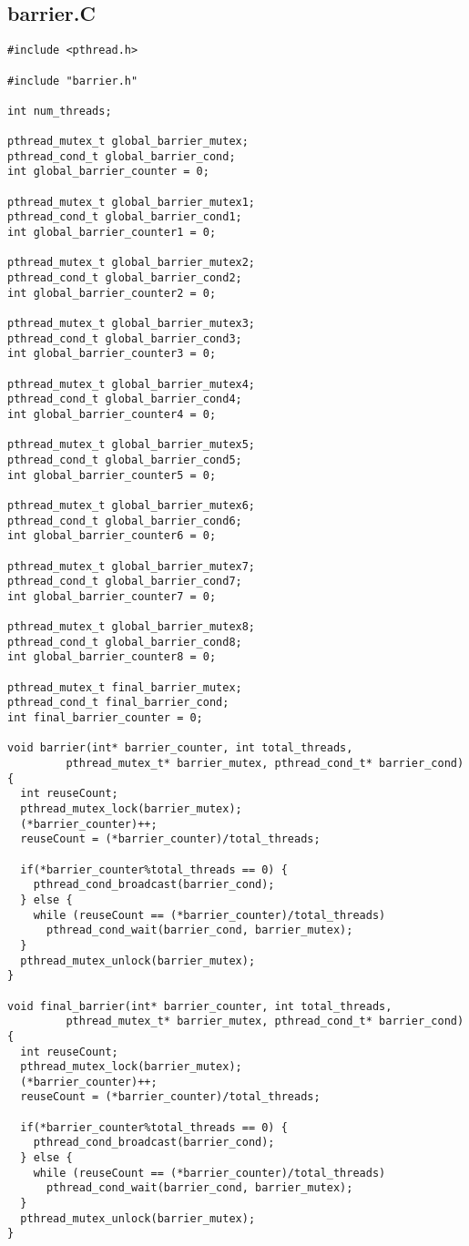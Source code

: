 \documentclass[]{article}
\begin{document}
\subsection{barrier.C}
\begin{verbatim}
#include <pthread.h>

#include "barrier.h"

int num_threads;

pthread_mutex_t global_barrier_mutex;
pthread_cond_t global_barrier_cond;
int global_barrier_counter = 0;

pthread_mutex_t global_barrier_mutex1;
pthread_cond_t global_barrier_cond1;
int global_barrier_counter1 = 0;

pthread_mutex_t global_barrier_mutex2;
pthread_cond_t global_barrier_cond2;
int global_barrier_counter2 = 0;

pthread_mutex_t global_barrier_mutex3;
pthread_cond_t global_barrier_cond3;
int global_barrier_counter3 = 0;

pthread_mutex_t global_barrier_mutex4;
pthread_cond_t global_barrier_cond4;
int global_barrier_counter4 = 0;

pthread_mutex_t global_barrier_mutex5;
pthread_cond_t global_barrier_cond5;
int global_barrier_counter5 = 0;

pthread_mutex_t global_barrier_mutex6;
pthread_cond_t global_barrier_cond6;
int global_barrier_counter6 = 0;

pthread_mutex_t global_barrier_mutex7;
pthread_cond_t global_barrier_cond7;
int global_barrier_counter7 = 0;

pthread_mutex_t global_barrier_mutex8;
pthread_cond_t global_barrier_cond8;
int global_barrier_counter8 = 0;

pthread_mutex_t final_barrier_mutex;
pthread_cond_t final_barrier_cond;
int final_barrier_counter = 0;

void barrier(int* barrier_counter, int total_threads, 
	     pthread_mutex_t* barrier_mutex, pthread_cond_t* barrier_cond) {
  int reuseCount;
  pthread_mutex_lock(barrier_mutex);
  (*barrier_counter)++;
  reuseCount = (*barrier_counter)/total_threads;
    
  if(*barrier_counter%total_threads == 0) {
    pthread_cond_broadcast(barrier_cond);
  } else {
    while (reuseCount == (*barrier_counter)/total_threads)
      pthread_cond_wait(barrier_cond, barrier_mutex);
  }
  pthread_mutex_unlock(barrier_mutex);
}

void final_barrier(int* barrier_counter, int total_threads, 
	     pthread_mutex_t* barrier_mutex, pthread_cond_t* barrier_cond) {
  int reuseCount;
  pthread_mutex_lock(barrier_mutex);
  (*barrier_counter)++;
  reuseCount = (*barrier_counter)/total_threads;
    
  if(*barrier_counter%total_threads == 0) {
    pthread_cond_broadcast(barrier_cond);
  } else {
    while (reuseCount == (*barrier_counter)/total_threads)
      pthread_cond_wait(barrier_cond, barrier_mutex);
  }
  pthread_mutex_unlock(barrier_mutex);
}
\end{verbatim}
\end{document}
